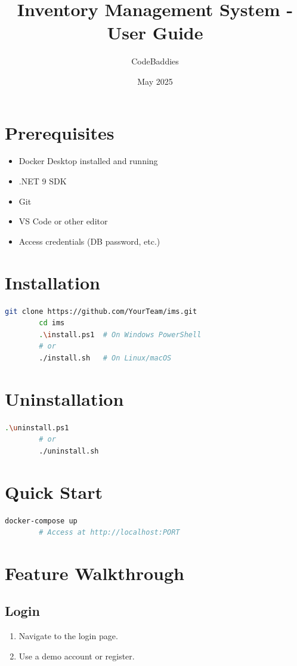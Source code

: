 \documentclass[12pt]{article}
\title{Inventory Management System - User Guide}
\author{CodeBaddies}
\date{May 2025}
\begin{document}
	
	\maketitle
	\tableofcontents
	\newpage
	
	\section{Prerequisites}
	\begin{itemize}[nosep]
		\item Docker Desktop installed and running
		\item .NET 9 SDK
		\item Git
		\item VS Code or other editor
		\item Access credentials (DB password, etc.)
	\end{itemize}
	
	\section{Installation}
	\begin{lstlisting}[language=bash]
		git clone https://github.com/YourTeam/ims.git
		cd ims
		.\install.ps1  # On Windows PowerShell
		# or
		./install.sh   # On Linux/macOS
	\end{lstlisting}
	
	\section{Uninstallation}
	\begin{lstlisting}[language=bash]
		.\uninstall.ps1
		# or
		./uninstall.sh
	\end{lstlisting}
	
	\section{Quick Start}
	\begin{lstlisting}[language=bash]
		docker-compose up
		# Access at http://localhost:PORT
	\end{lstlisting}
	
	\section{Feature Walkthrough}
	
	\subsection{Login}
	\begin{enumerate}[nosep]
		\item Navigate to the login page.
		\item Use a demo account or register.
	\end{enumerate}
	
\end{document}
